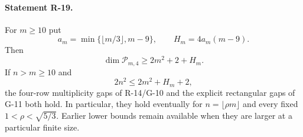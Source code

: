 \paragraph{Statement R-19.}
For $m\geq10$ put
\[
 a_m=\min\{\lfloor m/3\rfloor,m-9\},\qquad
 H_m=4a_m(m-9).
\]
Then
\begin{equation}\label{R19:dimension}
 \dim\mathcal P_{m,4}\geq2m^2+2+H_m.
\end{equation}
If $n>m\geq10$ and
\begin{equation}\label{R19:padding}
 2n^2\leq2m^2+H_m+2,
\end{equation}
the four-row multiplicity gaps of R-14/G-10 and the explicit
rectangular gaps of G-11 both hold. In particular, they hold
eventually for $n=\lfloor\rho m\rfloor$ and every fixed
$1<\rho<\sqrt{5/3}$. Earlier lower bounds remain available
when they are larger at a particular finite size.

